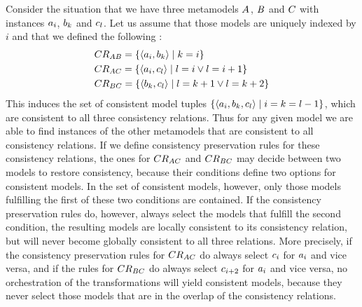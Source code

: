 Consider the situation that we have three metamodels $A_{}$, $B_{}$ and $C_{}$ with instances $a_{i}$, $b_{k}$ and $c_{l}$.
Let us assume that those models are uniquely indexed by $i$ and that we defined the following \modellevelconsistencyrelations:
\begin{align*}
    &
    CR_{AB} = \{ \langle a_{i}, b_{k} \rangle \mid k = i \} \\
    &
    CR_{AC} = \{ \langle a_{i}, c_{l} \rangle \mid l = i \lor l = i+1 \} \\
    &
    CR_{BC} = \{ \langle b_{k}, c_{l} \rangle \mid l = k+1 \lor l = k+2 \}
\end{align*}
This induces the set of consistent model tuples $\{ \langle a_{i}, b_{k}, c_{l} \rangle \mid  i = k = l-1 \}$, which are consistent to all three consistency relations.
Thus for any given model we are able to find instances of the other metamodels that are consistent to all consistency relations.
If we define consistency preservation rules for these consistency relations, the ones for $CR_{AC}$ and $CR_{BC}$ may decide between two models to restore consistency, because their conditions define two options for consistent models.
In the set of consistent models, however, only those models fulfilling the first of these two conditions are contained.
If the consistency preservation rules do, however, always select the models that fulfill the second condition, the resulting models are locally consistent to its consistency relation, but will never become globally consistent to all three relations.
More precisely, if the consistency preservation rules for $CR_{AC}$ do always select $c_{i}$ for $a_{i}$ and vice versa, and if the rules for $CR_{BC}$ do always select $c_{i+2}$ for $a_{i}$ and vice versa, no orchestration of the transformations will yield consistent models, because they never select those models that are in the overlap of the consistency relations.

